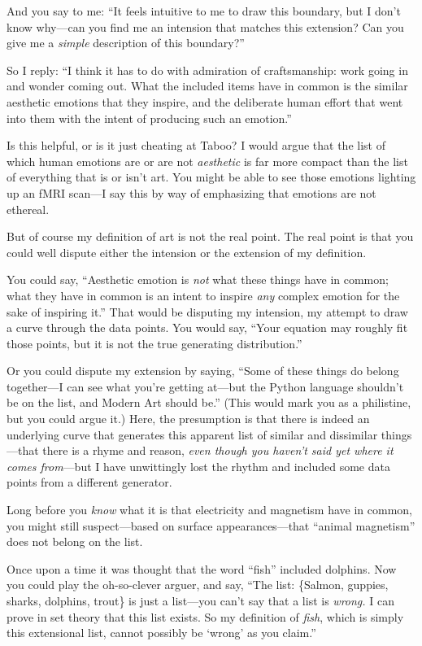 {
 And you say to me: ``It feels intuitive to me to
draw this boundary, but I don't know why---can you find
me an intension that matches this extension? Can you give me a
\textit{simple} description of this boundary?''}

{
 So I reply: ``I think it has to do with
admiration of craftsmanship: work going in and wonder coming out. What
the included items have in common is the similar aesthetic emotions
that they inspire, and the deliberate human effort that went into them
with the intent of producing such an emotion.''}

{
 Is this helpful, or is it just cheating at Taboo? I would argue
that the list of which human emotions are or are not \textit{aesthetic}
is far more compact than the list of everything that is or
isn't art. You might be able to see those emotions
lighting up an fMRI scan---I say this by way of emphasizing that
emotions are not ethereal.}

{
 But of course my definition of art is not the real point. The real
point is that you could well dispute either the intension or the
extension of my definition.}

{
 You could say, ``Aesthetic emotion is
\textit{not} what these things have in common; what they have in common
is an intent to inspire \textit{any} complex emotion for the sake of
inspiring it.'' That would be disputing my intension,
my attempt to draw a curve through the data points. You would say,
``Your equation may roughly fit those points, but it
is not the true generating distribution.''}

{
 Or you could dispute my extension by saying,
``Some of these things do belong together---I can see
what you're getting at---but the Python language
shouldn't be on the list, and Modern Art should
be.'' (This would mark you as a philistine, but you
could argue it.) Here, the presumption is that there is indeed an
underlying curve that generates this apparent list of similar and
dissimilar things---that there is a rhyme and reason, \textit{even
though you haven't said yet where it comes
from}{}---but I have unwittingly lost the rhythm and included some data
points from a different generator.}

{
 Long before you \textit{know} what it is that electricity and
magnetism have in common, you might still suspect---based on surface
appearances---that ``animal
magnetism'' does not belong on the list.}

{
 Once upon a time it was thought that the word
``fish'' included dolphins. Now you
could play the oh-so-clever arguer, and say, ``The
list: \{Salmon, guppies, sharks,
dolphins, trout\} is just a
list---you can't say that a list is \textit{wrong.} I
can prove in set theory that this list exists. So my definition of
\textit{fish}, which is simply this extensional list, cannot possibly
be `wrong' as you
claim.''}

